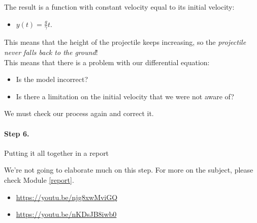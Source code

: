 \begin{example}
The result is a function with constant velocity equal to its initial velocity:
\begin{itemize}
	\item $y(t) = \frac{g}{\gamma}t.$
\end{itemize}

This means that the height of the projectile keeps increasing, so the \emph{projectile never falls back to the ground}! \\

This means that there is a problem with our differential equation:
\begin{itemize}
	\item Is the model incorrect? 
	\item Is there a limitation on the initial velocity that we were not aware of?
\end{itemize}
\hfil

We must check our process again and correct it.
\end{example}




\paragraph{Step 6.} Putting it all together in a report

We're not going to elaborate much on this step. For more on the subject, please check Module \ref{report}.





\begin{video}
\begin{itemize}
	\item \href{https://youtu.be/njg8xwMviGQ}{https://youtu.be/njg8xwMviGQ} \hfill {}
	\item \href{https://youtu.be/nKDsJB8iwb0}{https://youtu.be/nKDsJB8iwb0} \hfill {}
\end{itemize}	
\end{video}

